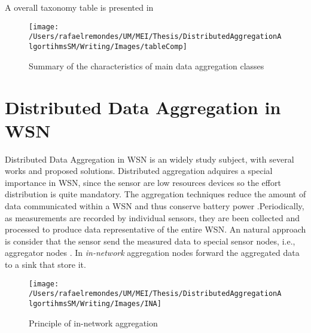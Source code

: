 \\
\\
A overall taxonomy table is presented in \cite{journals/corr/abs-1110-0725}

\begin{figure}[h]
\centering
\texttt{[image: /Users/rafaelremondes/UM/MEI/Thesis/DistributedAggregationAlgortihmsSM/Writing/Images/tableComp]}
\caption{\label{fig:TableTax} Summary of the characteristics of main data aggregation classes}
\end{figure}

\section{Distributed Data Aggregation in WSN}
Distributed Data Aggregation in WSN is an widely study subject, with several works and proposed solutions. Distributed aggregation adquires a special importance in WSN, since the sensor are low resources devices so the effort distribution is quite mandatory. The aggregation techniques reduce the amount of data communicated within a WSN and thus conserve battery power \cite{castelluccia2005efficient}.Periodically, as measurements are recorded by individual sensors, they are been collected and processed to produce data representative of the entire WSN.  An natural approach is consider that the sensor send the measured data to special sensor nodes, i.e., aggregator nodes \cite{castelluccia2005efficient}. In \textit{in-network} aggregation nodes forward the aggregated data to a sink that store it.\\
\begin{figure}[h]
\centering
\texttt{[image: /Users/rafaelremondes/UM/MEI/Thesis/DistributedAggregationAlgortihmsSM/Writing/Images/INA]}
\caption{\label{fig:INAaggregation} Principle of in-network aggregation}
\end{figure}
